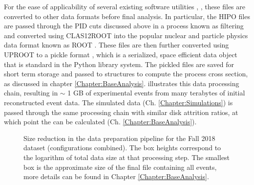     
    For the ease of applicability of several existing software utilities \parencite{Virtanen2020SciPyPython}, \parencite{Harris2020ArrayNumPy}, these files are converted to other data formats before final analysis. In particular, the HIPO files are passed through the PID cuts discussed above in a process known as filtering \parencite{Lee2023FilterEvents} and converted using CLAS12ROOT \parencite{Glazier2023Clas12root} into the popular nuclear and particle physics data format known as ROOT \parencite{Brun1997ROOTFramework}. These files are then further converted using UPROOT \parencite{Pivarski2022Scikit-hep/uproot4:4.2.1} to a pickle format \parencite{Python2023PickleSerialization}, which is a serialized, space efficient data object that is standard in the Python library system. The pickled files are saved for short term storage and passed to structures to compute the process cross section, as discussed in chapter \ref{Chapter:BaseAnalysis}.  illustrates this data processing chain, resulting in $\sim$ 1 GB of experimental events from many terabytes of initial reconstructed event data. The simulated data (Ch. \ref{Chapter:Simulations}) is passed through the same processing chain with similar disk attrition ratios, at which point the \xsec can be calculated (Ch. \ref{Chapter:BaseAnalysis}). 

        
    \begin{figure}
        \centering
         \caption[Data Processing Pipeline]{Size reduction in the data preparation pipeline for the Fall 2018 dataset (configurations combined). The box heights correspond to the logarithm of total data size at that processing step. The smallest box is the approximate size of the final file containing all \dvpip events, more details can be found in Chapter \ref{Chapter:BaseAnalysis}.}
         \label{fig:DataReductionPipeline}
    \end{figure}


